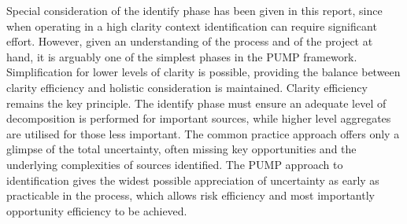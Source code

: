 Special consideration of the identify phase has been given in this report, since when operating in a high clarity context identification can require significant effort.
However, given an understanding of the process and of the project at hand, it is arguably one of the simplest phases in the PUMP framework.
Simplification for lower levels of clarity is possible, providing the balance between clarity efficiency and holistic consideration is maintained.
Clarity efficiency remains the key principle.
The identify phase must ensure an adequate level of decomposition is performed for important sources, while higher level aggregates are utilised for those less important.
The common practice approach offers only a glimpse of the total uncertainty, often missing key opportunities and the underlying complexities of sources identified.
The PUMP approach to identification gives the widest possible appreciation of uncertainty as early as practicable in the process, which allows risk efficiency and most importantly opportunity efficiency to be achieved.









